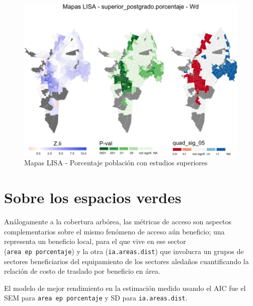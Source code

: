 \documentclass[12pt,a4paper,openany]{book}
\theoremstyle{definition}
\theoremstyle{definition}
\theoremstyle{definition}
\theoremstyle{remark}
\begin{document}
\begin{figure}

{\centering \includegraphics[width=1\linewidth]{tesis-unigis_files/figure-latex/lisa-superiores-1} 

}

\caption{Mapas LISA - Porcentaje población con estudios superiores}\label{fig:lisa-superiores}
\end{figure}

\section{Sobre los espacios verdes}\label{sobre-los-espacios-verdes}

Análogamente a la cobertura arbórea, las métricas de acceso son aspectos
complementarios sobre el mismo fenómeno de acceso aún beneficio; una
representa un beneficio local, para el que vive en ese sector
(\texttt{area\ ep\ porcentaje}) y la otra (\texttt{ia.areas.dist}) que
involucra un grupos de sectores beneficiarios del equipamiento de los
sectores aledaños cuantificando la relación de costo de traslado por
beneficio en área.

El modelo de mejor rendimiento en la estimación medido usando el AIC fue
el SEM para \texttt{area\ ep\ porcentaje} y SD para
\texttt{ia.areas.dist}.
\end{document}

